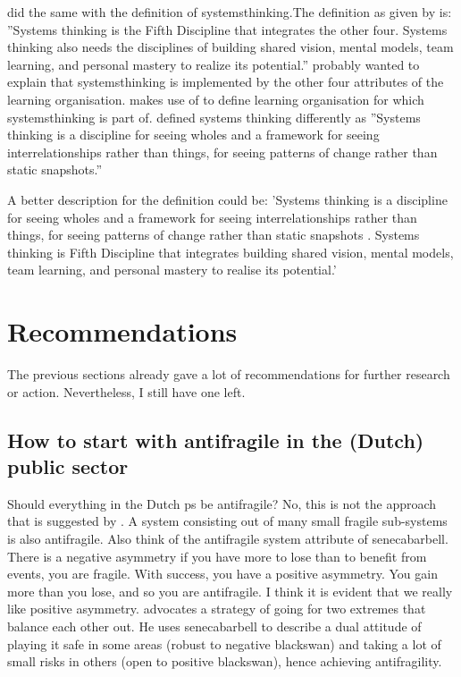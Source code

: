 \Textcite{Botjes2021} did the same with the definition of \gls{systemsthinking}.The definition as given by \textcite{Botjes2021} is: ''Systems thinking is the Fifth Discipline that integrates the other four. Systems thinking also needs the disciplines of building shared vision, mental models, team learning, and personal mastery to realize its potential.'' \textcite{Botjes2021} probably wanted to explain that \gls{systemsthinking} is implemented by the other four \glspl{attribute} of the learning organisation.  \textcite{Botjes2021} makes use of \textcite{Senge1994} to define learning organisation for which \gls{systemsthinking} is part of. \textcite{Senge1994} defined systems thinking differently as ''Systems thinking is a discipline for seeing wholes and a framework for seeing interrelationships rather than things, for seeing patterns of change rather than static snapshots.''

A better description for the definition could be: 'Systems thinking is a discipline for seeing wholes and a framework for seeing interrelationships rather than things, for seeing patterns of change rather than static snapshots \parencite{Senge1994}. Systems thinking is \textcite{Senge1994} Fifth Discipline that integrates building shared vision, mental models, team learning, and personal mastery to realise its potential.'

\section{Recommendations}
\label{sec:reccomandations}
The previous sections already gave a lot of recommendations for further research or action. Nevertheless, I still have one left.

\subsection{How to start with antifragile in the (Dutch) public sector}
\label{sub:howtostart}
Should everything in the Dutch \gls{ps} be \gls{antifragile}? No, this is not the approach that is suggested by \textcite{Taleb2012}. A system consisting out of many small \gls{fragile} sub-systems is also \gls{antifragile}. Also think of the \gls{antifragile} system \gls{attribute} of \gls{senecabarbell}. There is a negative asymmetry if you have more to lose than to benefit from events, you are fragile. With success, you have a positive asymmetry. You gain more than you lose, and so you are \gls{antifragile}. I think it is evident that we really like positive asymmetry. \textcite{Taleb2012} advocates a strategy of going for two extremes that balance each other out. He uses \gls{senecabarbell} to describe a dual attitude of playing it safe in some areas (robust to negative \gls{blackswan}) and taking a lot of small risks in others (open to positive \gls{blackswan}), hence achieving \gls{antifragility}.

